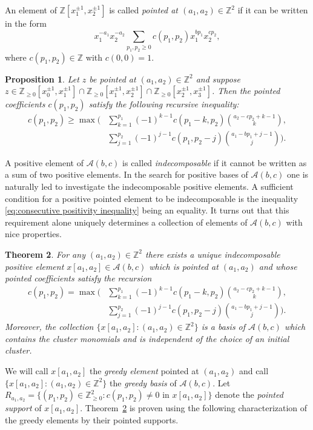 \documentclass[11pt]{amsart}
\newtheorem{theorem}{Theorem}[section]
\newtheorem{prop}[theorem]{Proposition}
\theoremstyle{remark}
\numberwithin{equation}{section}
\newcommand{\ZZ}{\mathbb{Z}}
\newcommand{\cA}{\mathcal{A}}
\begin{document}
An element of $\ZZ[x_1^{\pm1},x_2^{\pm1}]$ is called \emph{pointed at
$(a_1,a_2)\in\ZZ^2$} if it can be written in the form
\[
  x_1^{-a_1}x_2^{-a_2}\sum\limits_{p_1,p_2\ge0}c(p_1,p_2)x_1^{bp_1}x_2^{cp_2},
\]
where $c(p_1,p_2)\in\ZZ$ with $c(0,0)=1$.   
\begin{prop}\cite[Proposition~1.5]{LLZ}
  Let $z$ be pointed at $(a_1,a_2)\in\ZZ^2$ and suppose
  $z\in\ZZ_{\ge0}[x_0^{\pm1},x_1^{\pm1}]
  \cap\ZZ_{\ge0}[x_1^{\pm1},x_2^{\pm1}]
  \cap\ZZ_{\ge0}[x_2^{\pm1},x_3^{\pm1}]$.
  Then the pointed coefficients $c(p_1,p_2)$ satisfy the following recursive
  inequality:
  \begin{align}
    \label{eq:consecutive positivity inequality}
    c(p_1,p_2)\ge\max\bigg(
    &\sum\limits_{k=1}^{p_1} (-1)^{k-1}c(p_1-k,p_2){a_2-cp_2+k-1\choose k},\\
    \nonumber&\sum\limits_{ j =1}^{p_2} (-1)^{ j -1}c(p_1,p_2- j ){a_1-bp_1+ j -1\choose  j }\bigg).
  \end{align}
\end{prop}
A positive element of $\cA(b,c)$ is called \emph{indecomposable} if it cannot
be written as a sum of two positive elements.  In the search for positive bases
of $\cA(b,c)$ one is naturally led to investigate the indecomposable positive
elements.  A sufficient condition for a positive pointed element to be
indecomposable is the inequality \eqref{eq:consecutive positivity inequality}
being an equality.  It turns out that this requirement alone uniquely determines
a collection of elements of $\cA(b,c)$ with nice properties.

\begin{theorem}\label{th:greedy}\cite[Theorem~1.7]{LLZ}
  For any $(a_1,a_2)\in\ZZ^2$ there exists a unique indecomposable positive
  element $x[a_1,a_2]\in\cA(b,c)$ which is pointed at $(a_1,a_2)$ and whose
  pointed coefficients satisfy the recursion
  \begin{align}
    \label{eq:greey recursion}
    c(p_1,p_2)=\max\bigg(
    &\sum\limits_{k=1}^{p_1} (-1)^{k-1}c(p_1-k,p_2){a_2-cp_2+k-1\choose k},\\
    \nonumber&\sum\limits_{ j =1}^{p_2} (-1)^{ j -1}c(p_1,p_2- j ){a_1-bp_1+ j -1\choose  j }\bigg).
  \end{align}
  Moreover, the collection $\{x[a_1,a_2]:(a_1,a_2)\in\ZZ^2\}$ is a basis of
  $\cA(b,c)$ which contains the cluster monomials and is independent of the
  choice of an initial cluster.
\end{theorem}
We will call $x[a_1,a_2]$ the \emph{greedy element} pointed at $(a_1,a_2)$ and
call $\{x[a_1,a_2]:(a_1,a_2)\in\ZZ^2\}$ the \emph{greedy basis} of $\cA(b,c)$.  Let
$R_{a_1,a_2}=\{(p_1,p_2)\in\ZZ_{\ge0}^2:c(p_1,p_2)\ne0 \text{ in } x[a_1,a_2]\}$ denote
the \emph{pointed support} of $x[a_1,a_2]$.  Theorem~\ref{th:greedy} is proven using the following characterization of the greedy elements by their
pointed supports.
\end{document}
